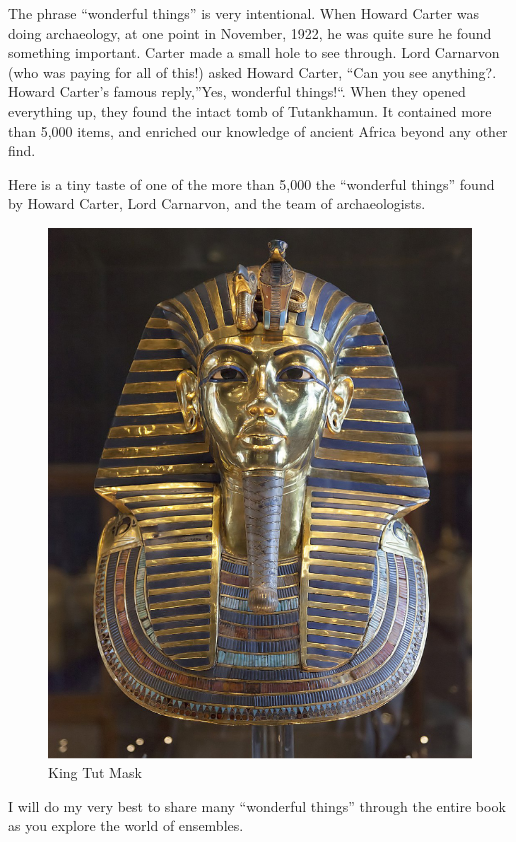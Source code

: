 \documentclass[
]{book}
\begin{document}
The phrase ``wonderful things'' is very intentional. When Howard Carter was doing archaeology, at one point in November, 1922, he was quite sure he found something important. Carter made a small hole to see through. Lord Carnarvon (who was paying for all of this!) asked Howard Carter, ``Can you see anything?. Howard Carter's famous reply,''Yes, wonderful things!{}``. When they opened everything up, they found the intact tomb of Tutankhamun. It contained more than 5,000 items, and enriched our knowledge of ancient Africa beyond any other find.

Here is a tiny taste of one of the more than 5,000 the ``wonderful things'' found by Howard Carter, Lord Carnarvon, and the team of archaeologists.

\begin{figure}
\centering
\includegraphics{_book/images/King_Tut_Mask.jpg}
\caption{King Tut Mask}
\end{figure}

I will do my very best to share many ``wonderful things'' through the entire book as you explore the world of ensembles.
\end{document}
